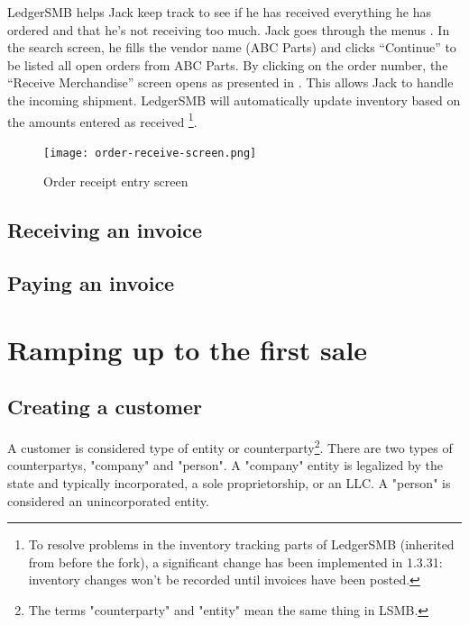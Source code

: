 LedgerSMB helps Jack keep track to see if he has received everything he has ordered and
that he's not receiving too much. Jack goes through the menus .
In the search screen, he fills the vendor name (ABC Parts) and clicks ``Continue'' to be listed
all open orders from ABC Parts. By clicking on the order number, the ``Receive Merchandise'' screen
opens as presented in . This allows Jack to handle the incoming
shipment. LedgerSMB will automatically update inventory based on the amounts entered as received
\footnote{To resolve problems in the inventory tracking parts of LedgerSMB (inherited from
before the fork), a significant change has been implemented in 1.3.31: inventory changes won't
be recorded until invoices have been posted.
}.

\begin{figure}[h]
\centering
\texttt{[image: order-receive-screen.png]}
\caption{Order receipt entry screen}
\label{fig:order-receive-screen}
\end{figure}

\section{Receiving an invoice}
\label{sec-stock-invoice}

\section{Paying an invoice}
\label{sec-stock-payment}



\chapter{Ramping up to the first sale}
\label{cha-ramping-up-to-the-first-sale}

\section{Creating a customer}
\label{sec-ramping-creating-a-customer}

A customer is considered type of \gls{entity} or \gls{counterparty}\footnote{The terms "counterparty" and "entity" mean the same thing in  LSMB.}.
There are two types of \glspl{counterparty}, "company" and "person". A "company" entity is legalized by the state and typically incorporated, a sole proprietorship, or an LLC. A "person" is considered an unincorporated entity.

